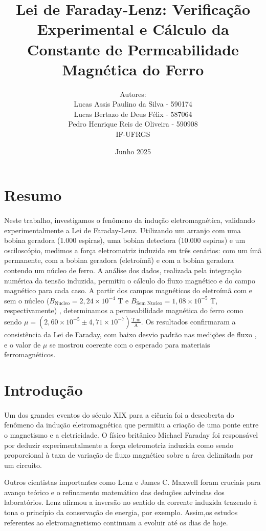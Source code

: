 \documentclass[column,brazilian,12pt,a4paper,final]{article}
\title{Lei de Faraday-Lenz: Verificação Experimental e Cálculo da Constante de Permeabilidade Magnética do Ferro}
\author{Autores: \\ Lucas Assis Paulino da Silva - 590174 \\Lucas Bertazo de Deus Félix - 587064
 \\ Pedro Henrique Reis de Oliveira - 590908 \\ IF-UFRGS}
\date{Junho 2025}
\begin{document}
\maketitle
\thispagestyle{fancy}

\section*{Resumo}
\paragraph{}
Neste trabalho, investigamos o fenômeno da indução eletromagnética, validando experimentalmente a Lei de Faraday-Lenz. Utilizando um arranjo com uma bobina geradora (1.000 espiras), uma bobina detectora (10.000 espiras) e um osciloscópio, medimos a força eletromotriz induzida em três cenários: com um ímã permanente, com a bobina geradora (eletroímã) e com a bobina geradora contendo um núcleo de ferro. A análise dos dados, realizada pela integração numérica da tensão induzida, permitiu o cálculo do fluxo magnético e do campo magnético para cada caso. A partir dos campos magnéticos do eletroímã com e sem o núcleo ($B_{\text{Nucleo}} = 2,24 \times 10^{-4}$ T e $B_{\text{Sem Nucleo}} = 1,08 \times 10^{-5}$ T, respectivamente) , determinamos a permeabilidade magnética do ferro como sendo $\mu = (2,60 \times 10^{-5} \pm 4,71 \times 10^{-7}) \frac{\text{T.m}}{\text{A}}$. Os resultados confirmaram a consistência da Lei de Faraday, com baixo desvio padrão nas medições de fluxo , e o valor de $\mu$ se mostrou coerente com o esperado para materiais ferromagnéticos.

\section{Introdução}
\paragraph{}
Um dos grandes eventos do século XIX para a ciência foi a descoberta do fenômeno da indução eletromagnética que permitiu a criação de uma ponte entre o magnetismo e a eletricidade. O físico britânico Michael Faraday foi responsável por deduzir experimentalmente a força eletromotriz induzida como sendo proporcional à taxa de variação de fluxo magnético sobre a área delimitada por um circuito.

Outros cientistas importantes como Lenz e James C. Maxwell foram cruciais para avanço teórico e o refinamento matemático das deduções advindas dos laboratórios. Lenz afirmou a inversão  no sentido da corrente induzida trazendo à tona o princípio da conservação de energia, por exemplo. Assim,os estudos referentes ao eletromagnetismo continuam a evoluir até os dias de hoje.
\end{document}
